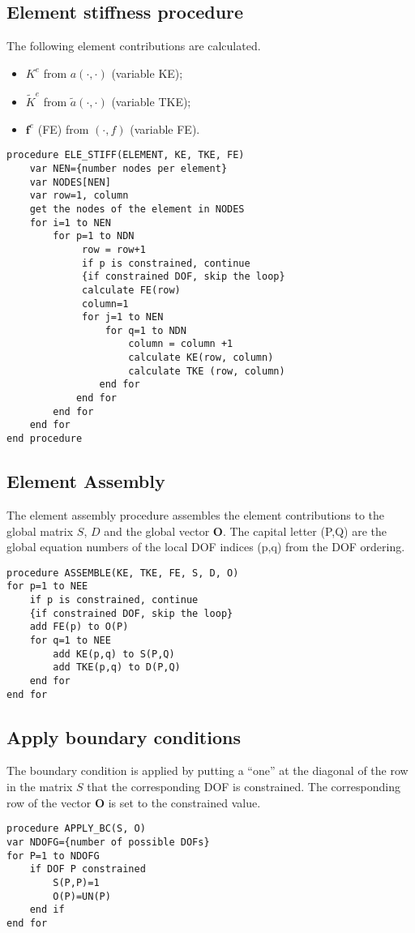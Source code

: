 \documentclass[11pt]{article}  %
\begin{document}
\subsection{Element stiffness procedure}
The following element contributions are calculated.
 \begin{itemize}
 \item $K^e$  from $a(\cdot, \cdot)$ (variable KE);
 \item $\tilde{K}^e$  from  $\tilde{a}(\cdot, \cdot)$  (variable TKE);
 \item $\mathbf{f}^e$ (FE) from  $(\cdot, f)$ (variable FE).
 \end{itemize}
\begin{samepage}
\begin{verbatim}
procedure ELE_STIFF(ELEMENT, KE, TKE, FE)
    var NEN={number nodes per element}
    var NODES[NEN]
    var row=1, column
    get the nodes of the element in NODES
    for i=1 to NEN
        for p=1 to NDN
             row = row+1
             if p is constrained, continue
             {if constrained DOF, skip the loop}
             calculate FE(row)
             column=1
             for j=1 to NEN
                 for q=1 to NDN
                     column = column +1
                     calculate KE(row, column)
                     calculate TKE (row, column)
                end for
            end for
        end for
    end for
end procedure
\end{verbatim}
\end{samepage}
 \subsection{Element Assembly}
 The element assembly procedure assembles the element contributions to the global matrix $S$, $D$ and the global vector $\mathbf{O}$. The capital letter (P,Q) are the global equation numbers  of the local DOF indices (p,q) from the DOF ordering. 
\begin{samepage}
\begin{verbatim}
procedure ASSEMBLE(KE, TKE, FE, S, D, O)
for p=1 to NEE
    if p is constrained, continue
    {if constrained DOF, skip the loop}
    add FE(p) to O(P)
    for q=1 to NEE
        add KE(p,q) to S(P,Q)
        add TKE(p,q) to D(P,Q)
    end for
end for
\end{verbatim}
\end{samepage}
\subsection{Apply boundary conditions}
The boundary condition is applied by putting a ``one'' at the diagonal of the row  in the matrix $S$ that the corresponding DOF is constrained. The corresponding row of the vector $\mathbf{O}$ is set to the constrained value. 
\begin{samepage}
\begin{verbatim}
procedure APPLY_BC(S, O)
var NDOFG={number of possible DOFs}
for P=1 to NDOFG
    if DOF P constrained 
        S(P,P)=1
        O(P)=UN(P)
    end if
end for
\end{verbatim}
\end{samepage}
\end{document}
